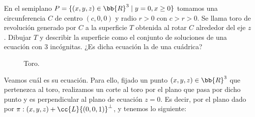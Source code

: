 \begin{ejercicio}
    En el semiplano $P = \{(x, y, z) \in \bb{R}^3\mid y = 0, x \geq 0\}$ tomamos una circunferencia $C$ de centro $(c, 0, 0)$ y radio $r > 0$ con $c > r > 0$.
    Se llama toro de revolución generado por $C$ a la superficie $T$ obtenida al rotar $C$ alrededor del eje $z$.
    Dibujar $T$ y describir la superficie como el conjunto de soluciones de una ecuación con 3 incógnitas. ¿Es dicha ecuación la de una cuádrica?\\

    \begin{figure}[H]
        \centering
        \caption{Toro.}
        \label{fig:Toro}
    \end{figure}

    Veamos cuál es su ecuación. Para ello, fijado un punto $(x,y,z)\in \bb{R}^3$ que pertenezca al toro, realizamos un corte al toro por el plano 
        que pasa por dicho punto y es perpendicular al plano de ecuación $z=0$. Es decir, por el plano dado por $\pi:(x,y,z)+{\cc{L}\{(0,0,1)\}}^{\perp}$,
        y tenemos lo siguiente:
        \begin{figure}[H]
            \centering
\end{figure}
\end{ejercicio}
